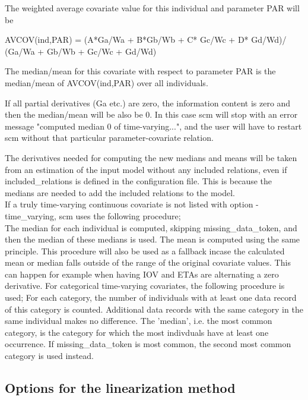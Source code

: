 \begin{optionlist}
The weighted average covariate value for this individual and parameter PAR will be
	
AVCOV(ind,PAR) = (A*Ga/Wa + B*Gb/Wb + C* Gc/Wc + D* Gd/Wd)/
(Ga/Wa + Gb/Wb + Gc/Wc + Gd/Wd)
	
The median/mean for this covariate with respect to parameter PAR is the median/mean of AVCOV(ind,PAR) over all individuals.
	
If all partial derivatives (Ga etc.) are zero, the information content is zero and then the median/mean will be also be 0.
In this case scm will stop with an error message "computed median 0 of time-varying...", and the user will have to restart scm without that particular parameter-covariate relation.
	
The derivatives needed for computing the new medians and means will be taken from an estimation of the input model without any included relations, even if included\_relations is defined in the configuration file. This is because the medians are needed to add the included relations to the model.\\
	

	
If a truly time-varying continuous covariate is not listed with option -time\_varying, scm uses the following procedure;\\
The median for each individual is computed, skipping missing\_data\_token, and then the median of these medians is used. The mean is computed using the same principle. This procedure will also be used as a fallback incase the calculated mean or median falls outside of the range of the original covariate values. This can happen for example when having IOV and ETAs are alternating a zero derivative. For categorical time-varying covariates, the following procedure is used;
For each category, the number of individuals with at least one data record of this category is counted. Additional data records with the same category in the same individual makes no difference. The 'median', i.e. the most common category, is the category for which the most indivduals have at least one occurrence. If missing\_data\_token is most common, the second most common category is used instead.
\nextopt
\end{optionlist}

\subsection{Options for the linearization method}

